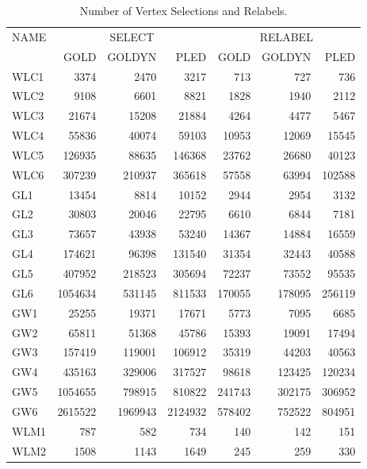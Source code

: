 \begin{table}[h]\begin{center}
\caption{Number of Vertex Selections and Relabels.\label{SelRel.tbl}} 
\begin{tabular}{||l||r|r|r||r|r|r||}
\hline
NAME & \multicolumn{3}{c||}{SELECT} &
\multicolumn{3}{c||}{RELABEL}\\
\cline{2-7}
 & GOLD & GOLDYN & PLED & GOLD & GOLDYN & PLED \\
\hline
WLC1 &   3374 &   2470 &   3217 &    713 &   727 &   736\\
WLC2 &   9108 &   6601 &   8821 &   1828 &  1940 &   2112\\
WLC3 &  21674 &  15208 &  21884 &   4264 &  4477 &   5467\\
WLC4 &  55836 &  40074 &  59103 &   10953 &  12069 &  15545\\
WLC5 &  126935 &  88635 &  146368 &   23762 &  26680 &  40123\\
WLC6 &  307239 &  210937 &  365618 &   57558 &  63994 &  102588\\
\hline
 GL1 &  13454 &   8814 &  10152 &   2944 &  2954 &   3132\\
 GL2 &  30803 &  20046 &  22795 &   6610 &  6844 &   7181\\
 GL3 &  73657 &  43938 &  53240 &   14367 &  14884 &  16559\\
 GL4 &  174621 &  96398 &  131540 &   31354 &  32443 &  40588\\
 GL5 &  407952 &  218523 &  305694 &   72237 &  73552 &  95535\\
 GL6 & 1054634 &  531145 &  811533 &  170055 & 178095 &  256119\\
\hline
 GW1 &  25255 &  19371 &  17671 &   5773 &  7095 &   6685\\
 GW2 &  65811 &  51368 &  45786 &   15393 &  19091 &  17494\\
 GW3 &  157419 &  119001 &  106912 &   35319 &  44203 &  40563\\
 GW4 &  435163 &  329006 &  317527 &   98618 & 123425 &  120234\\
 GW5 & 1054655 &  798915 &  810822 &  241743 & 302175 &  306952\\
 GW6 & 2615522 & 1969943 & 2124932 &  578402 & 752522 &  804951\\
\hline
WLM1 &   787 &   582 &   734 &    140 &   142 &   151\\
WLM2 &   1508 &   1143 &   1649 &    245 &   259 &   330\\

\end{tabular}
\end{center}
\end{table}
